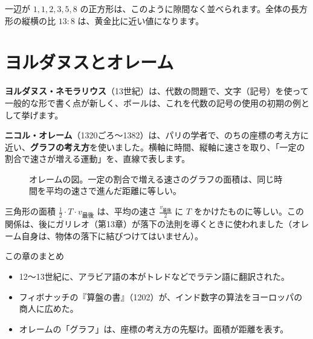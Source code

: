 \documentclass[a4paper,11pt,openany]{ltjsbook}
\begin{document}
一辺が $1,1,2,3,5,8$ の正方形は、このように隙間なく並べられます。全体の長方形の縦横の比 $13:8$ は、黄金比に近い値になります。

\section{ヨルダヌスとオレーム}

\textbf{ヨルダヌス・ネモラリウス}（13世紀）は、代数の問題で、文字（記号）を使って一般的な形で書く点が新しく、ボールは、これを代数の記号の使用の初期の例として挙げます。

\textbf{ニコル・オレーム}（1320ごろ〜1382）は、パリの学者で、のちの座標の考え方に近い、\textbf{グラフの考え方}を使いました。横軸に時間、縦軸に速さを取り、「一定の割合で速さが増える運動」を、直線で表します。

\begin{figure}[htbp]
\centering
{}
\caption{オレームの図。一定の割合で増える速さのグラフの面積は、同じ時間を平均の速さで進んだ距離に等しい。}
\end{figure}

三角形の面積 $\tfrac12\cdot T\cdot v_{\text{最後}}$ は、平均の速さ $\tfrac{v_{\text{最後}}}2$ に $T$ をかけたものに等しい。この関係は、後にガリレオ（第13章）が落下の法則を導くときに使われました（オレーム自身は、物体の落下に結びつけてはいません）。

\begin{pointbox}{この章のまとめ}
\begin{itemize}[leftmargin=*]
\item 12〜13世紀に、アラビア語の本がトレドなどでラテン語に翻訳された。
\item フィボナッチの『算盤の書』（1202）が、インド数字の算法をヨーロッパの商人に広めた。
\item オレームの「グラフ」は、座標の考え方の先駆け。面積が距離を表す。
\end{itemize}
\end{pointbox}
\end{document}
